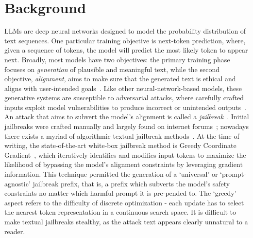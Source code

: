 
\section{Background}
\label{background}

 LLMs are deep neural networks designed to model the probability distribution of text sequences. One particular training objective is next-token prediction, where, given a sequence of tokens, the model will predict the most likely token to appear next. 
Broadly, most models have two objectives: the primary training phase focuses on \textit{generation} of plausible and meaningful text, while the second objective, \textit{alignment}, aims to make sure that the generated text is ethical and aligns with user-intended goals~\citep{ouyang2022traininglanguagemodelsfollow, wei2022finetunedlanguagemodelszeroshot}.
Like other neural-network-based models, these generative systems are susceptible to adversarial attacks, where carefully crafted inputs exploit model vulnerabilities to produce incorrect or unintended outputs~\citep{szegedy2014intriguingpropertiesneuralnetworks, biggioadversarial}. 
An attack that aims to subvert the model's alignment is called a \textit{jailbreak}~\citep{wallace2021nlpattacks, ebrahimi2018hotflip, jia-liang-2017-adversarial}. 
Initial jailbreaks were crafted manually and largely found on internet forums~\citep{shen2024dan}; nowadays there exists a myriad of algorithmic textual jailbreak methods~\citep{yi2024jailbreakattacksdefenses}. At the time of writing, the state-of-the-art white-box jailbreak method is Greedy Coordinate Gradient~\citep{zou2023gcg}, which iteratively identifies and modifies input tokens to maximize the likelihood of bypassing the model's alignment constraints by leveraging gradient information. This technique permitted the generation of a `universal' or `prompt-agnostic' jailbreak prefix, that is, a prefix which subverts the model's safety constraints no matter which harmful prompt it is pre-pended to. The `greedy' aspect refers to the difficulty of discrete optimization - each update has to select the nearest token representation in a continuous search space. It is difficult to make textual jailbreaks stealthy, as the attack text appears clearly unnatural to a reader.

